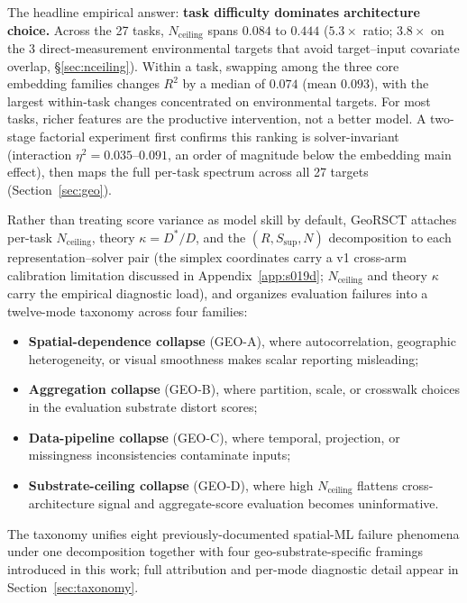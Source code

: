 \documentclass{article}
\begin{document}
The headline empirical answer: \textbf{task difficulty dominates architecture choice.} Across the 27 tasks, $N_{\text{ceiling}}$ spans $0.084$ to $0.444$ ($5.3{\times}$ ratio; $3.8{\times}$ on the 3 direct-measurement environmental targets that avoid target--input covariate overlap, \S\ref{sec:nceiling}). Within a task, swapping among the three core embedding families changes $R^2$ by a median of $0.074$ (mean $0.093$), with the largest within-task changes concentrated on environmental targets. For most tasks, richer features are the productive intervention, not a better model. A two-stage factorial experiment first confirms this ranking is solver-invariant (interaction $\eta^2 = 0.035$--$0.091$, an order of magnitude below the embedding main effect), then maps the full per-task spectrum across all 27 targets (Section~\ref{sec:geo}).

Rather than treating score variance as model skill by default, GeoRSCT attaches per-task $N_{\text{ceiling}}$, theory $\kappa = D^*/D$, and the $(R, S_{\text{sup}}, N)$ decomposition to each representation--solver pair (the simplex coordinates carry a v1 cross-arm calibration limitation discussed in Appendix~\ref{app:s019d}; $N_{\text{ceiling}}$ and theory $\kappa$ carry the empirical diagnostic load), and organizes evaluation failures into a twelve-mode taxonomy across four families:
\begin{itemize}
\item \textbf{Spatial-dependence collapse} (GEO-A), where autocorrelation, geographic heterogeneity, or visual smoothness makes scalar reporting misleading;
\item \textbf{Aggregation collapse} (GEO-B), where partition, scale, or crosswalk choices in the evaluation substrate distort scores;
\item \textbf{Data-pipeline collapse} (GEO-C), where temporal, projection, or missingness inconsistencies contaminate inputs;
\item \textbf{Substrate-ceiling collapse} (GEO-D), where high $N_{\text{ceiling}}$ flattens cross-architecture signal and aggregate-score evaluation becomes uninformative.
\end{itemize}

The taxonomy unifies eight previously-documented spatial-ML failure phenomena under one decomposition together with four geo-substrate-specific framings introduced in this work; full attribution and per-mode diagnostic detail appear in Section~\ref{sec:taxonomy}.
\end{document}

